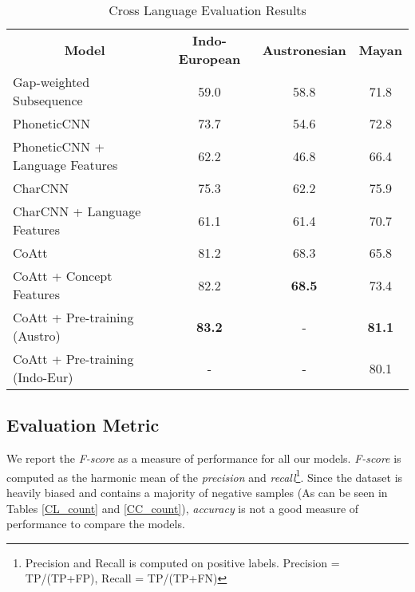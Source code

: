 \documentclass[11pt,letterpaper]{article}
\begin{document}
\begin{table*}[t]
\centering
\begin{tabular}{lccc}
\multicolumn{1}{c}{\textbf{Model}} & \textbf{Indo-European} & \textbf{Austronesian} & \textbf{Mayan} \\
Gap-weighted Subsequence           & 59.0                   & 58.8                  & 71.8           \\
PhoneticCNN                        & 73.7                   & 54.6                  & 72.8           \\
PhoneticCNN + Language Features                 & 62.2                   & 46.8                  & 66.4           \\
CharCNN                            & 75.3                   & 62.2                  & 75.9           \\
CharCNN + Language Features                     & 61.1                   & 61.4                  & 70.7           \\ \hline
CoAtt                              & 81.2                   & 68.3                  & 65.8          \\
CoAtt + Concept Features                   & 82.2                   & \textbf{68.5}                  & 73.4          \\
CoAtt + Pre-training (Austro)                    & \textbf{83.2}                   & -                  & \textbf{81.1}     \\
CoAtt + Pre-training (Indo-Eur)               & -                   & -                  & 80.1          
\end{tabular}
\label{CL_res}
\caption{Cross Language Evaluation Results}
\end{table*}

\subsection{Evaluation Metric}

We report the \textit{F-score} as a measure of performance for all our models. \textit{F-score} is computed as the harmonic mean of the \textit{precision} and \textit{recall}\footnote{Precision and Recall is computed on positive labels. Precision = TP/(TP+FP), Recall = TP/(TP+FN)}. Since the dataset is heavily biased and contains a majority of negative samples (As can be seen in Tables \ref{CL_count} and \ref{CC_count}), \textit{accuracy} is not a good measure of performance to compare the models.
\end{document}
